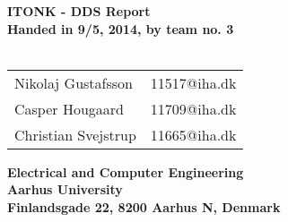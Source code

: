 
\begin{titlepage}
\begin{center}
{\LARGE \textbf{ITONK - DDS Report}}\\


\vspace{4cm}
\textbf{Handed in 9/5, 2014, by team no. 3}\\~\\
\begin{tabular}{ll}
Nikolaj Gustafsson  & 11517@iha.dk \\
Casper Hougaard  & 11709@iha.dk \\
Christian Svejstrup  & 11665@iha.dk \\
\end{tabular}
\vfill
\textbf{Electrical and Computer Engineering}\\
\textbf{Aarhus University}\\
\textbf{Finlandsgade 22, 8200 Aarhus N, Denmark}
\end{center}
\end{titlepage}